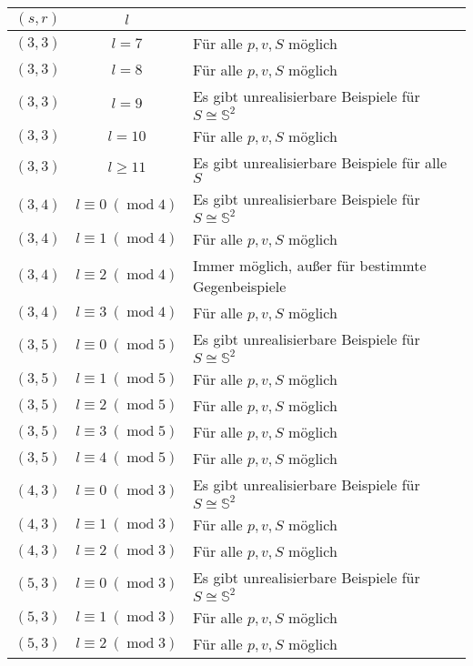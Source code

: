 \documentclass[10pt, notheorems]{beamer}
\newcommand{\sphere}{\mathbb{S}}
\renewcommand{\mod}{\operatorname{mod}}
\begin{document}
\begin{frame}
  \begin{tabularx}{\textwidth}{|c|c|X|}
    \hline
    $(s, r)$ & $l$ &\\
    \hline
    $(3, 3)$ & $l = 7$               & Für alle $p, v, S$ möglich\\
    $(3, 3)$ & $l = 8$               & Für alle $p, v, S$ möglich\\
    $(3, 3)$ & $l = 9$               & Es gibt unrealisierbare Beispiele für $S \cong \sphere^2$\\
    $(3, 3)$ & $l = 10$              & Für alle $p, v, S$ möglich\\
    $(3, 3)$ & $l \geq 11$           & Es gibt unrealisierbare Beispiele für alle $S$\\
    $(3, 4)$ & $l \equiv 0~(\mod 4)$ & Es gibt unrealisierbare Beispiele für $S \cong \sphere^2$\\
    $(3, 4)$ & $l \equiv 1~(\mod 4)$ & Für alle $p, v, S$ möglich\\
    $(3, 4)$ & $l \equiv 2~(\mod 4)$ & Immer möglich, außer für bestimmte Gegenbeispiele\\
    $(3, 4)$ & $l \equiv 3~(\mod 4)$ & Für alle $p, v, S$ möglich\\
    $(3, 5)$ & $l \equiv 0~(\mod 5)$ & Es gibt unrealisierbare Beispiele für $S \cong \sphere^2$\\
    $(3, 5)$ & $l \equiv 1~(\mod 5)$ & Für alle $p, v, S$ möglich\\
    $(3, 5)$ & $l \equiv 2~(\mod 5)$ & Für alle $p, v, S$ möglich\\
    $(3, 5)$ & $l \equiv 3~(\mod 5)$ & Für alle $p, v, S$ möglich\\
    $(3, 5)$ & $l \equiv 4~(\mod 5)$ & Für alle $p, v, S$ möglich\\
    $(4, 3)$ & $l \equiv 0~(\mod 3)$ & Es gibt unrealisierbare Beispiele für $S \cong \sphere^2$\\
    $(4, 3)$ & $l \equiv 1~(\mod 3)$ & Für alle $p, v, S$ möglich\\
    $(4, 3)$ & $l \equiv 2~(\mod 3)$ & Für alle $p, v, S$ möglich\\
    $(5, 3)$ & $l \equiv 0~(\mod 3)$ & Es gibt unrealisierbare Beispiele für $S \cong \sphere^2$\\
    $(5, 3)$ & $l \equiv 1~(\mod 3)$ & Für alle $p, v, S$ möglich\\
    $(5, 3)$ & $l \equiv 2~(\mod 3)$ & Für alle $p, v, S$ möglich\\
    \hline
  \end{tabularx}
\end{frame}
\end{document}
